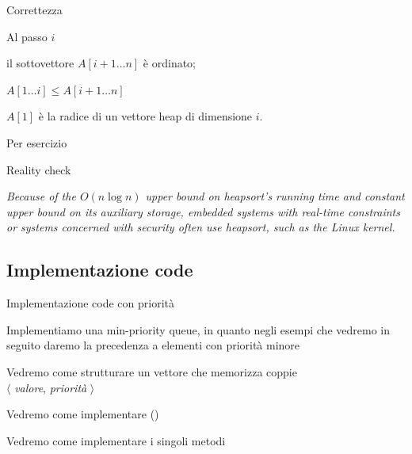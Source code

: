 \begin{frame}{Correttezza}
    
\vspace{-9pt}
\begin{myboxtitle}
\smallskip
Al passo $i$
\BIL
\item il sottovettore $A[i+1 \ldots n]$ è ordinato; 
\item $A[1 \ldots i] \leq A[i+1 \ldots n]$ 
\item $A[1]$ è la radice di un vettore heap di dimensione $i$.
\EIL
\end{myboxtitle}

\begin{myboxtitle}[Dimostrazione]
\smallskip
Per esercizio
\end{myboxtitle}

\end{frame}

\begin{frame}{Reality check}
\begin{myboxtitle}
\emph{Because of the $O(n \log n)$ upper bound on heapsort's running time and constant upper bound on its auxiliary storage, embedded systems with real-time constraints or systems concerned with security often use heapsort, such as the Linux kernel.}
\end{myboxtitle}

\end{frame}

\subsection{Implementazione code}

\begin{frame}{Implementazione code con priorità}

\vspace{-9pt}
Implementiamo una min-priority queue, in quanto negli esempi che vedremo
in seguito daremo la precedenza a elementi con priorità minore

\BIL
\item Vedremo come strutturare un vettore che memorizza coppie\\
  $\langle$ \textit{valore}, \textit{priorità} $\rangle$
\item Vedremo come implementare \minheapify()
\item Vedremo come implementare i singoli metodi
\EIL

\end{frame}

